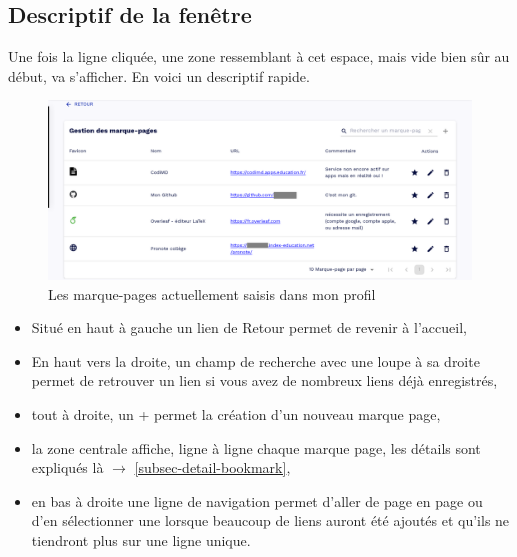 \subsection{Descriptif de la fenêtre}
Une fois la ligne cliquée, une zone ressemblant à cet espace, mais vide bien sûr au début, va s'afficher. 
En voici un descriptif rapide.
\begin{figure}
	\centering
	\includegraphics{./Captures/portail.marque.pages.gestion.png}
	\caption{Les marque-pages actuellement saisis dans mon profil}
\end{figure}
\begin{itemize}
	\item Situé en haut à gauche un lien de Retour permet de revenir à l'accueil,
	\item En haut vers la droite, un champ de recherche avec une loupe à sa droite permet de retrouver un lien si vous avez de nombreux liens déjà enregistrés,
	\item tout à droite, un + permet la création d'un nouveau marque page,
	\item la zone centrale affiche, ligne à ligne chaque marque page, les détails sont expliqués là $\rightarrow$ \ref{subsec-detail-bookmark},
	\item en bas à droite une ligne de navigation permet d'aller de page en page ou d'en sélectionner une lorsque beaucoup de liens auront été ajoutés et qu'ils ne tiendront plus sur une ligne unique.
\end{itemize}

